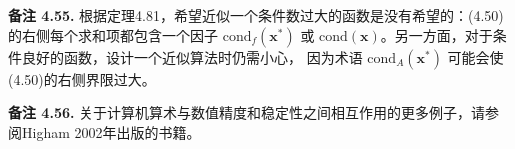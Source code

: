\documentclass[a4paper]{ctexart}
\begin{document}
{\noindent \textbf{备注 4.55.} 根据定理4.81，希望近似一个条件数过大的函数是没有希望的：(4.50)的右侧每个求和项都包含一个因子 
\( \text{cond}_f(\mathbf{x}^*) \) 或 \( \text{cond}(\mathbf{x}) \)。另一方面，对于条件良好的函数，设计一个近似算法时仍需小心，
因为术语 \( \text{cond}_A(\mathbf{x}^*) \) 可能会使(4.50)的右侧界限过大。

\noindent \textbf{备注 4.56.} 关于计算机算术与数值精度和稳定性之间相互作用的更多例子，请参阅Higham 2002年出版的书籍。 








}
\end{document}
